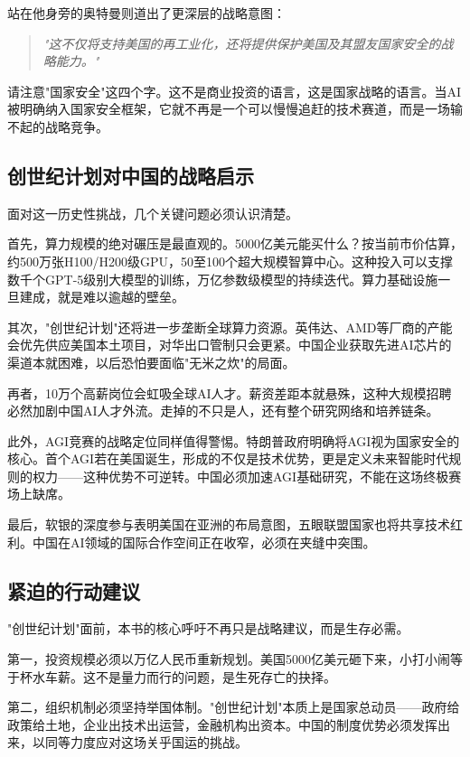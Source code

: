 站在他身旁的奥特曼则道出了更深层的战略意图：
\begin{quote}
\textit{"这不仅将支持美国的再工业化，还将提供保护美国及其盟友国家安全的战略能力。"}
\end{quote}

请注意"国家安全"这四个字。这不是商业投资的语言，这是国家战略的语言。当AI被明确纳入国家安全框架，它就不再是一个可以慢慢追赶的技术赛道，而是一场输不起的战略竞争。

\subsection{创世纪计划对中国的战略启示}

面对这一历史性挑战，几个关键问题必须认识清楚。

首先，算力规模的绝对碾压是最直观的。5000亿美元能买什么？按当前市价估算，约500万张H100/H200级GPU，50至100个超大规模智算中心。这种投入可以支撑数千个GPT-5级别大模型的训练，万亿参数级模型的持续迭代。算力基础设施一旦建成，就是难以逾越的壁垒。

其次，"创世纪计划"还将进一步垄断全球算力资源。英伟达、AMD等厂商的产能会优先供应美国本土项目，对华出口管制只会更紧。中国企业获取先进AI芯片的渠道本就困难，以后恐怕要面临"无米之炊"的局面。

再者，10万个高薪岗位会虹吸全球AI人才。薪资差距本就悬殊，这种大规模招聘必然加剧中国AI人才外流。走掉的不只是人，还有整个研究网络和培养链条。

此外，AGI竞赛的战略定位同样值得警惕。特朗普政府明确将AGI视为国家安全的核心。首个AGI若在美国诞生，形成的不仅是技术优势，更是定义未来智能时代规则的权力——这种优势不可逆转。中国必须加速AGI基础研究，不能在这场终极赛场上缺席。

最后，软银的深度参与表明美国在亚洲的布局意图，五眼联盟国家也将共享技术红利。中国在AI领域的国际合作空间正在收窄，必须在夹缝中突围。

\subsection{紧迫的行动建议}

"创世纪计划"面前，本书的核心呼吁不再只是战略建议，而是生存必需。

第一，投资规模必须以万亿人民币重新规划。美国5000亿美元砸下来，小打小闹等于杯水车薪。这不是量力而行的问题，是生死存亡的抉择。

第二，组织机制必须坚持举国体制。"创世纪计划"本质上是国家总动员——政府给政策给土地，企业出技术出运营，金融机构出资本。中国的制度优势必须发挥出来，以同等力度应对这场关乎国运的挑战。


